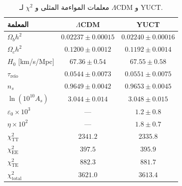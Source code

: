 \documentclass[11pt,a4paper]{article}
\begin{document}
	\begin{table}[H]
		\centering
		\caption{معلمات المواءمة المثلى و $\chi^2$ لـ $\Lambda$CDM و YUCT.}
		\label{tab:results}
		\LARGE
		\begin{tabular}{lcc}
			\toprule
			المعلمة & $\Lambda$CDM & YUCT \\
			\midrule
			$\Omega_b h^2$ & $0.02237 \pm 0.00015$ & $0.02240 \pm 0.00016$ \\
			$\Omega_c h^2$ & $0.1200 \pm 0.0012$ & $0.1192 \pm 0.0014$ \\
			$H_0$ [km/s/Mpc] & $67.36 \pm 0.54$ & $67.55 \pm 0.58$ \\
			$\tau_{\mathrm{reio}}$ & $0.0544 \pm 0.0073$ & $0.0551 \pm 0.0075$ \\
			$n_s$ & $0.9649 \pm 0.0042$ & $0.9653 \pm 0.0045$ \\
			$\ln(10^{10}A_s)$ & $3.044 \pm 0.014$ & $3.048 \pm 0.015$ \\
			$\varepsilon_0 \times 10^3$ & — & $1.2 \pm 0.8$ \\
			$\eta \times 10^2$ & — & $1.8 \pm 0.7$ \\
			\midrule
			$\chi^2_{\mathrm{TT}}$ & $2341.2$ & $2335.8$ \\
			$\chi^2_{\mathrm{EE}}$ & $397.5$ & $395.9$ \\
			$\chi^2_{\mathrm{TE}}$ & $882.3$ & $881.7$ \\
			$\chi^2_{\mathrm{total}}$ & $3621.0$ & $3613.4$ \\
			\bottomrule
		\end{tabular}
	\end{table}
	
\end{document}
